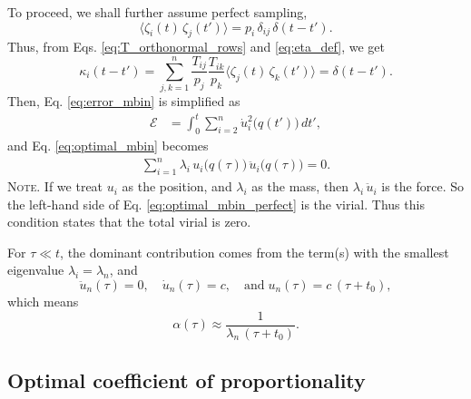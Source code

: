 \documentclass[reprint]{revtex4-1}
\newcommand{\note}[1]{{\color{DarkGreen}\footnotesize \textsc{Note.} #1}}
\begin{document}
To proceed, we shall further assume perfect sampling,
%
\begin{equation}
  \langle \zeta_i(t) \, \zeta_j(t') \rangle
  =
  p_i \, \delta_{ij} \, \delta(t - t').
  \label{eq:zz_perfect}
\end{equation}
%
Thus, from Eqs. \eqref{eq:T_orthonormal_rows} and \eqref{eq:eta_def},
we get
%
\begin{equation}
  \kappa_i(t - t')
  =
  \sum_{j,k = 1}^n
  \frac{ T_{ij} } { p_j }
  \frac{ T_{ik} } { p_k }
  \langle \zeta_j(t) \, \zeta_k(t') \rangle
  =
  \delta(t - t').
  \label{eq:kappa_perfect}
\end{equation}
%
Then, Eq. \eqref{eq:error_mbin} is simplified as
%
\begin{align}
  \mathcal E
  &=
  \int_0^t
  \sum_{i = 2}^n
  \dot u_i^2\bigl( q(t') \bigr) \, dt',
  \label{eq:error_mbin_perfect}
\end{align}
%
and Eq. \eqref{eq:optimal_mbin} becomes
%
\begin{align}
  \sum_{i=1}^n
  \lambda_i \, u_i\bigl( q(\tau) \bigr) \, \ddot u_i\bigl( q(\tau) \bigr) = 0.
  \label{eq:optimal_mbin_perfect}
\end{align}
%
\note{If we treat $u_i$ as the position,
  and $\lambda_i$ as the mass,
  then $\lambda_i \, \ddot u_i$ is the force.
  So the left-hand side of Eq. \eqref{eq:optimal_mbin_perfect}
  is the virial.
  Thus this condition states that the total virial is zero.
}



%
%
For $\tau \ll t$,
the dominant contribution comes from
the term(s) with the smallest eigenvalue $\lambda_i = \lambda_n$,
and
$$
\ddot u_n(\tau) = 0,
\quad
\dot u_n(\tau) = c,
\quad
\mathrm{and}\;
u_n(\tau) = c \, (\tau + t_0),
$$
which means
$$
\alpha(\tau) \approx \frac{1}{\lambda_n \, (\tau + t_0)}.
$$



\subsection{Optimal coefficient of proportionality}
\end{document}
